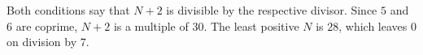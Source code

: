 Both conditions say that $N+2$ is divisible by the respective divisor. Since $5$ and $6$ are coprime, $N+2$ is a multiple of $30$. The least positive $N$ is $28$, which leaves $\boxed0$ on division by $7$.
